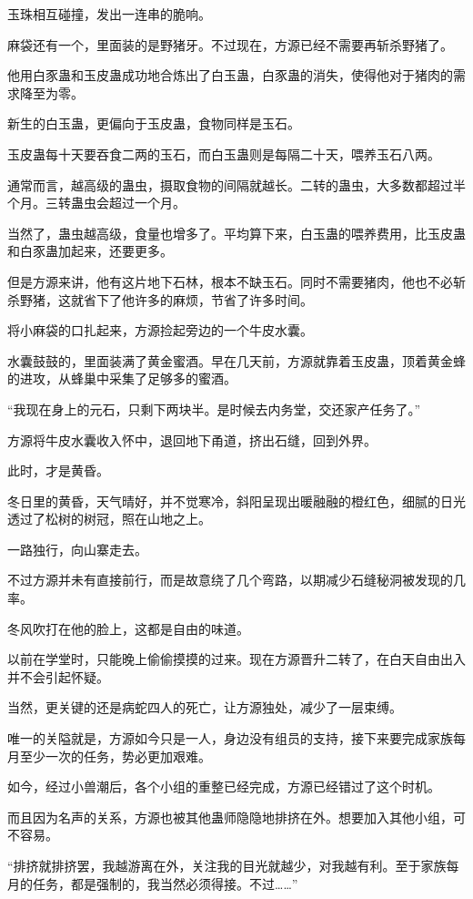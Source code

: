 \begin{this_body}
玉珠相互碰撞，发出一连串的脆响。

麻袋还有一个，里面装的是野猪牙。不过现在，方源已经不需要再斩杀野猪了。

他用白豕蛊和玉皮蛊成功地合炼出了白玉蛊，白豕蛊的消失，使得他对于猪肉的需求降至为零。

新生的白玉蛊，更偏向于玉皮蛊，食物同样是玉石。

玉皮蛊每十天要吞食二两的玉石，而白玉蛊则是每隔二十天，喂养玉石八两。

通常而言，越高级的蛊虫，摄取食物的间隔就越长。二转的蛊虫，大多数都超过半个月。三转蛊虫会超过一个月。

当然了，蛊虫越高级，食量也增多了。平均算下来，白玉蛊的喂养费用，比玉皮蛊和白豕蛊加起来，还要更多。

但是方源来讲，他有这片地下石林，根本不缺玉石。同时不需要猪肉，他也不必斩杀野猪，这就省下了他许多的麻烦，节省了许多时间。

将小麻袋的口扎起来，方源捡起旁边的一个牛皮水囊。

水囊鼓鼓的，里面装满了黄金蜜酒。早在几天前，方源就靠着玉皮蛊，顶着黄金蜂的进攻，从蜂巢中采集了足够多的蜜酒。

“我现在身上的元石，只剩下两块半。是时候去内务堂，交还家产任务了。”

方源将牛皮水囊收入怀中，退回地下甬道，挤出石缝，回到外界。

此时，才是黄昏。

冬日里的黄昏，天气晴好，并不觉寒冷，斜阳呈现出暖融融的橙红色，细腻的日光透过了松树的树冠，照在山地之上。

一路独行，向山寨走去。

不过方源并未有直接前行，而是故意绕了几个弯路，以期减少石缝秘洞被发现的几率。

冬风吹打在他的脸上，这都是自由的味道。

以前在学堂时，只能晚上偷偷摸摸的过来。现在方源晋升二转了，在白天自由出入并不会引起怀疑。

当然，更关键的还是病蛇四人的死亡，让方源独处，减少了一层束缚。

唯一的关隘就是，方源如今只是一人，身边没有组员的支持，接下来要完成家族每月至少一次的任务，势必更加艰难。

如今，经过小兽潮后，各个小组的重整已经完成，方源已经错过了这个时机。

而且因为名声的关系，方源也被其他蛊师隐隐地排挤在外。想要加入其他小组，可不容易。

“排挤就排挤罢，我越游离在外，关注我的目光就越少，对我越有利。至于家族每月的任务，都是强制的，我当然必须得接。不过……”


\end{this_body}
